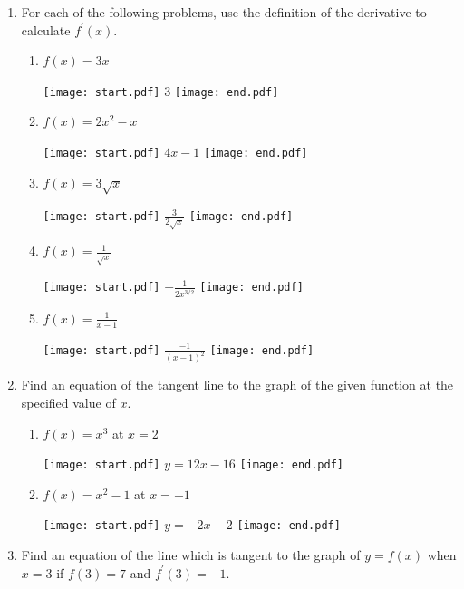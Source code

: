 \documentclass[12pt]{article}
\begin{document}
\begin{enumerate}

\item For each of the following problems, use the definition of the derivative to calculate $f^{\prime}(x)$. 

\begin{enumerate}

\item $f(x) = 3x$ 

\texttt{[image: start.pdf]}
{{3}}
\texttt{[image: end.pdf]}


\item $f(x) = 2x^2-x$ 

\texttt{[image: start.pdf]}
{{$4x-1$}}
\texttt{[image: end.pdf]}


\item $f(x) = 3\sqrt{x}$ 

\texttt{[image: start.pdf]}
{{$\displaystyle \frac{3}{2\sqrt{x}}$}}
\texttt{[image: end.pdf]}


\item $\displaystyle f(x)=\frac{1}{\sqrt{x}}$

\texttt{[image: start.pdf]}
{{$\displaystyle -\frac{1}{2x^{3/2}}$}}
\texttt{[image: end.pdf]}


\item $\displaystyle f(x) = \frac{1}{x-1}$ 

\texttt{[image: start.pdf]}
{{$\displaystyle \frac{-1}{(x-1)^2}$}}
\texttt{[image: end.pdf]}


\end{enumerate}

\item Find an equation of the tangent line to the graph of the given function at the specified value of $x$. 

\begin{enumerate}

\item $f(x) = x^3$ at $x=2$ 

\texttt{[image: start.pdf]}
{{$y=12x-16$}}
\texttt{[image: end.pdf]}


\item $f(x) = x^2-1$ at $x=-1$ 

\texttt{[image: start.pdf]}
{{$y=-2x-2$}}
\texttt{[image: end.pdf]}
 

\end{enumerate}

\item Find an equation of the line which is tangent to the graph of $y=f(x)$ when $x=3$ if $f(3)=7$ and $f^{\prime}(3)=-1$.


\end{enumerate}
\end{document}
